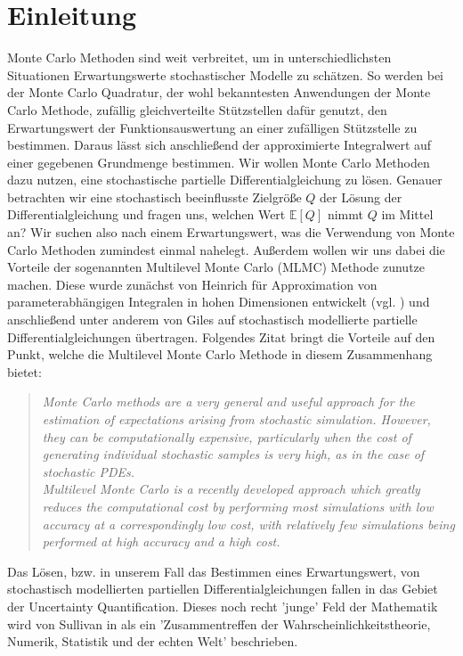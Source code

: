 
\section{Einleitung}

Monte Carlo Methoden sind weit verbreitet, um in unterschiedlichsten Situationen Erwartungswerte stochastischer Modelle zu schätzen.
So werden bei der Monte Carlo Quadratur, der wohl bekanntesten Anwendungen der Monte Carlo Methode, zufällig gleichverteilte Stützstellen dafür genutzt, den Erwartungswert der Funktionsauswertung an einer zufälligen Stützstelle zu bestimmen. Daraus lässt sich anschließend der approximierte Integralwert auf einer gegebenen Grundmenge bestimmen. 
Wir wollen Monte Carlo Methoden dazu nutzen, eine stochastische partielle Differentialgleichung zu lösen. 
Genauer betrachten wir eine stochastisch beeinflusste Zielgröße $ Q $ der Lösung der Differentialgleichung und fragen uns, welchen Wert $ \mathbb{E}[Q] $ nimmt $ Q $ im Mittel an? Wir suchen also nach einem Erwartungswert, was die Verwendung von Monte Carlo Methoden zumindest einmal nahelegt. 
Außerdem wollen wir uns dabei die Vorteile der sogenannten Multilevel Monte Carlo (MLMC) Methode zunutze machen. Diese wurde zunächst von Heinrich für Approximation von parameterabhängigen Integralen in hohen Dimensionen entwickelt (vgl. \cite{heinrich2001multilevel}) und anschließend unter anderem von  Giles auf stochastisch modellierte partielle Differentialgleichungen übertragen. Folgendes Zitat bringt die Vorteile auf den Punkt, welche die Multilevel Monte Carlo Methode in diesem Zusammenhang bietet:
\begin{quote}
	\textit{Monte Carlo methods are a very general and useful approach for the estimation of expectations arising from stochastic simulation. However, they can be computationally expensive, particularly when the cost of generating individual stochastic samples is very high, as in the case of stochastic PDEs. \\ Multilevel Monte Carlo is a recently developed approach which greatly reduces the computational cost by performing most simulations with low accuracy at a correspondingly low cost, with relatively few simulations being performed at high accuracy and a high cost.}  \\
\end{quote}
Das Lösen, bzw. in unserem Fall das Bestimmen eines Erwartungswert, von stochastisch modellierten partiellen Differentialgleichungen fallen in das Gebiet der Uncertainty Quantification. Dieses noch recht 'junge' Feld der Mathematik wird von Sullivan in \cite{sullivan2015introduction} als ein 'Zusammentreffen der Wahrscheinlichkeitstheorie, Numerik, Statistik und der echten Welt' beschrieben. \\
